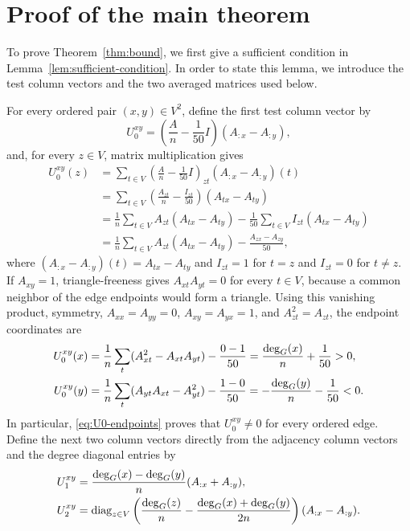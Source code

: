 \documentclass[11pt]{article}
\begin{document}
\section{Proof of the main theorem}\label{sec:proof}


To prove Theorem~\ref{thm:bound}, we first give a sufficient condition
in Lemma~\ref{lem:sufficient-condition}.
In order to state this lemma, we introduce the test column vectors
and the two averaged matrices used below.


For every ordered pair $(x,y)\in V^2$, define the first test column vector by
\begin{equation}\label{eq:U0}
U_0^{xy}=\left(\frac An-\frac1{50}I\right)(A_{:x}-A_{:y}),
\end{equation}
and, for every $z\in V$, matrix multiplication gives
\begin{align*}
U_0^{xy}(z)
&=\sum_{t\in V}
\left(\frac An-\frac1{50}I\right)_{zt}
(A_{:x}-A_{:y})(t)\\
&=\sum_{t\in V}
\left(\frac{A_{zt}}n-\frac{I_{zt}}{50}\right)(A_{tx}-A_{ty})\\
&=\frac1n\sum_{t\in V}A_{zt}(A_{tx}-A_{ty})
-\frac1{50}\sum_{t\in V}I_{zt}(A_{tx}-A_{ty})\\
&=\frac1n\sum_{t\in V}A_{zt}(A_{tx}-A_{ty})
-\frac{A_{zx}-A_{zy}}{50},
\end{align*}
where $(A_{:x}-A_{:y})(t)=A_{tx}-A_{ty}$ and
$I_{zt}=1$ for $t=z$ and $I_{zt}=0$ for $t\ne z$.
If $A_{xy}=1$, triangle-freeness gives $A_{xt}A_{yt}=0$ for every $t\in V$, because a common neighbor of the edge endpoints would form a triangle.
Using this vanishing product, symmetry, $A_{xx}=A_{yy}=0$, $A_{xy}=A_{yx}=1$, and $A_{zt}^2=A_{zt}$, the endpoint coordinates are
\begin{align}
U_0^{xy}(x)
&=\frac1n\sum_t(A_{xt}^2-A_{xt}A_{yt})-\frac{0-1}{50}
=\frac{\deg_G(x)}n+\frac1{50}>0,\notag\\
U_0^{xy}(y)
&=\frac1n\sum_t(A_{yt}A_{xt}-A_{yt}^2)-\frac{1-0}{50}
=-\frac{\deg_G(y)}n-\frac1{50}<0.
\label{eq:U0-endpoints}
\end{align}
In particular, \eqref{eq:U0-endpoints} proves that $U_0^{xy}\ne0$ for every ordered edge.
Define the next two column vectors directly from the adjacency column vectors and the degree diagonal entries by
\begin{align}
U_1^{xy}
&=\frac{\deg_G(x)-\deg_G(y)}n(A_{:x}+A_{:y}),\notag\\
U_2^{xy}
&=\operatorname{diag}_{z\in V}\left(
\frac{\deg_G(z)}n-\frac{\deg_G(x)+\deg_G(y)}{2n}\right)(A_{:x}-A_{:y}).
\label{eq:U12}
\end{align}
\end{document}
